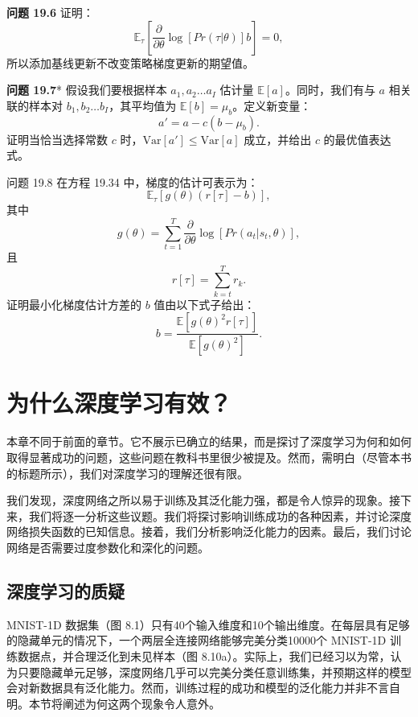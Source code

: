 \documentclass[lang=cn,newtx,10pt,scheme=chinese]{elegantbook}
\begin{document}
\textbf{问题 19.6} 证明：
\begin{equation}
\mathbb{E}_\tau \left[ \frac{\partial}{\partial \theta} \log[Pr(\tau|\theta)]b \right] = 0, 
\end{equation}
所以添加基线更新不改变策略梯度更新的期望值。

\textbf{问题 19.7}* 假设我们要根据样本 \(a_1, a_2 \ldots a_I\) 估计量 \(\mathbb{E}[a]\)。同时，我们有与 \(a\) 相关联的样本对 \(b_1, b_2 \ldots b_I\)，其平均值为 \(\mathbb{E}[b] = \mu_b\)。定义新变量：
\begin{equation}
a' = a - c(b - \mu_b). 
\end{equation}
证明当恰当选择常数 \(c\) 时，\(\text{Var}[a'] \leq \text{Var}[a]\) 成立，并给出 \(c\) 的最优值表达式。

问题 19.8 在方程 19.34 中，梯度的估计可表示为：
\begin{equation}
\mathbb{E}_\tau \left[ g(\theta)(r[\tau] - b) \right], 
\end{equation}
其中
\begin{equation}
g(\theta) = \sum_{t=1}^{T} \frac{\partial}{\partial \theta} \log[Pr(a_t|s_t, \theta)], 
\end{equation}
且
\begin{equation}
r[\tau] = \sum_{k=t}^{T} r_k. 
\end{equation}
证明最小化梯度估计方差的 \(b\) 值由以下式子给出：
\begin{equation}
b = \frac{\mathbb{E}[g(\theta)^2r[\tau]]}{\mathbb{E}[g(\theta)^2]}. 
\end{equation}

\chapter{为什么深度学习有效？}

本章不同于前面的章节。它不展示已确立的结果，而是探讨了深度学习为何和如何取得显著成功的问题，这些问题在教科书里很少被提及。然而，需明白（尽管本书的标题所示），我们对深度学习的理解还很有限。

我们发现，深度网络之所以易于训练及其泛化能力强，都是令人惊异的现象。接下来，我们将逐一分析这些议题。我们将探讨影响训练成功的各种因素，并讨论深度网络损失函数的已知信息。接着，我们分析影响泛化能力的因素。最后，我们讨论网络是否需要过度参数化和深化的问题。

\section{深度学习的质疑}
MNIST-1D 数据集（图 8.1）只有40个输入维度和10个输出维度。在每层具有足够的隐藏单元的情况下，一个两层全连接网络能够完美分类10000个 MNIST-1D 训练数据点，并合理泛化到未见样本（图 8.10a）。实际上，我们已经习以为常，认为只要隐藏单元足够，深度网络几乎可以完美分类任意训练集，并预期这样的模型会对新数据具有泛化能力。然而，训练过程的成功和模型的泛化能力并非不言自明。本节将阐述为何这两个现象令人意外。
\end{document}
